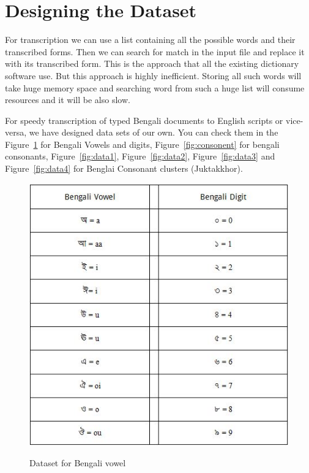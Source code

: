 \documentclass[12pt,oneside,openany,a4paper]{book}
\begin{document}
\section{Designing the Dataset}
For transcription we can use a list containing all the possible words and their transcribed forms. Then we can search for match in the input file and replace it with its transcribed form. This is the approach that all the existing dictionary software use. But this approach is highly inefficient. Storing all such words will take huge memory space and searching word from such a huge list will consume resources and it will be also slow. \par
For speedy transcription of typed Bengali documents to English scripts or vice-versa, we have designed data sets of our own. You can check them in the Figure~\ref{fig:vowel} for Bengali Vowels and digits, Figure~\ref{fig:consonent} for bengali consonants, Figure~\ref{fig:data1}, Figure~\ref{fig:data2}, Figure~\ref{fig:data3} and Figure~\ref{fig:data4} for Benglai Consonant clusters (Juktakkhor).
\begin{figure}
		\caption{Dataset for Bengali vowel}
		\centering
		\includegraphics[scale=0.7]{vowel}
		\label{fig:vowel}
\end{figure} \par
\end{document}

